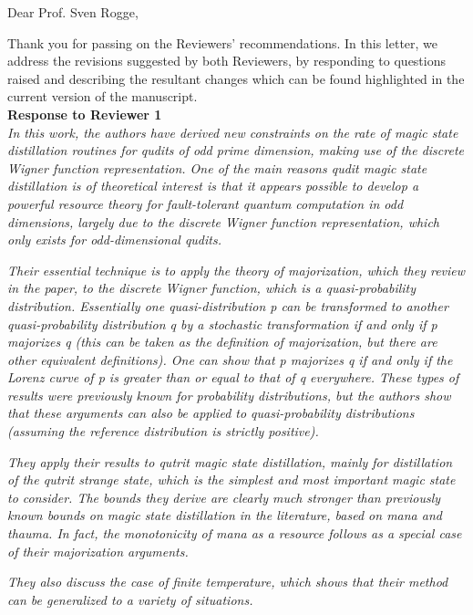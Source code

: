 \documentclass[11pt]{letter}
\begin{document}
Dear Prof. Sven Rogge,

Thank you for passing on the Reviewers' recommendations.
In this letter, we address the revisions suggested by both Reviewers, by responding to questions raised and describing the resultant changes which can be found highlighted in the current version of the manuscript.\\

\textbf{\large{Response to Reviewer 1}}\\

\textit{In this work, the authors have derived new constraints on the rate of magic state distillation routines for qudits of odd prime dimension, making use of the discrete Wigner function representation. One of the main reasons qudit magic state distillation is of theoretical interest is that it appears possible to develop a powerful resource theory for fault-tolerant quantum computation in odd dimensions, largely due to the discrete Wigner function representation, which only exists for odd-dimensional qudits.}

\textit{Their essential technique is to apply the theory of majorization, which they review in the paper, to the discrete Wigner function, which is a quasi-probability distribution. Essentially one quasi-distribution p can be transformed to another quasi-probability distribution q by a stochastic transformation if and only if p majorizes q (this can be taken as the definition of majorization, but there are other equivalent definitions). One can show that p majorizes q if and only if the Lorenz curve of p is greater than or equal to that of q everywhere. These types of results were previously known for probability distributions, but the authors show that these arguments can also be applied to quasi-probability distributions (assuming the reference distribution is strictly positive).}

\textit{They apply their results to qutrit magic state distillation, mainly for distillation of the qutrit strange state, which is the simplest and most important magic state to consider. The bounds they derive are clearly much stronger than previously known bounds on magic state distillation in the literature, based on mana and thauma. In fact, the monotonicity of mana as a resource follows as a special case of their majorization arguments.}

\textit{They also discuss the case of finite temperature, which shows that their method can be generalized to a variety of situations.}
\end{document}
